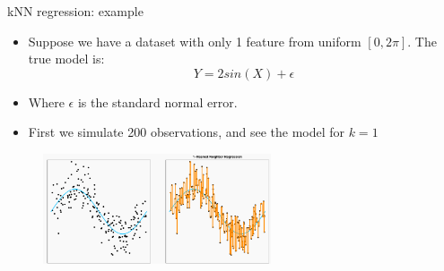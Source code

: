 \documentclass[serif, aspectratio=169]{beamer}
\begin{document}
\begin{frame}{kNN regression: example}
    \begin{itemize}
        \item Suppose we have a dataset with only 1 feature from uniform $[0, 2\pi]$. The true model is:
        \[Y = 2sin(X) + \epsilon\]
        \item Where $\epsilon$ is the standard normal error.
        \item First we simulate 200 observations, and see the model for $k=1$
    \end{itemize}
    
    \begin{figure}[h]
            \centering
            
            \includegraphics[width=0.6\textwidth]{pic/knnReg1.png}
            \end{figure}
    
\end{frame}
\end{document}
